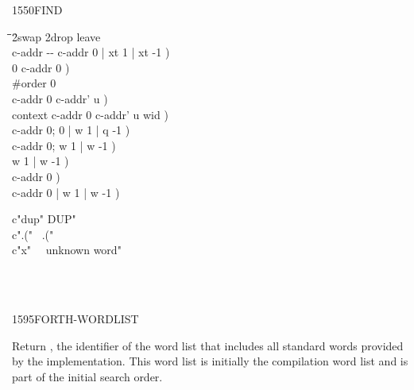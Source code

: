 \begin{worddef}{1550}{FIND}
\begin{implement}
		\begin{tabbing}
		\tab \= \tab \= \tab \= \tab \= 2swap 2drop leave \tab \= \\\kill
		\word{:}   c-addr -{}- c-addr 0 | xt 1 | xt -1 ) \+ \\
			0 														\>\>\>\>	 c-addr 0 ) \\
			\#order  0  \+ \\
				 							\>\>\>	 c-addr 0 c-addr' u ) \\
				  context \word{+} 		\>\>\>	 c-addr 0 c-addr' u wid ) \\
												\>\>\>	 c-addr 0; 0 | w 1 | q -1 ) \\
				 								\>\>\>	\word{p} c-addr 0; w 1 | w -1 ) \+ \\
				\>	  			\>		 w 1 | w -1 )  \\
															\>\>	 c-addr 0 ) \- \\
															\>\>\>	 c-addr 0 | w 1 | w -1 ) \- \\
		\word{;}
		\end{tabbing}
	\end{implement}

	\begin{testing}\ttfamily
		\word{:} c"dup"  DUP" \word{;} \\
		\word{:} c".("~  .("~ \word{;} \\
		\word{:} c"x"~~  unknown word" \word{;}

		 \\
		 \\
	\end{testing}
\end{worddef}


\begin{worddef}{1595}{FORTH-WORDLIST}
\item {}

	Return , the identifier of the word list that includes
	all standard words provided by the implementation. This word list
	is initially the compilation word list and is part of the initial
	search order.

	\begin{testing}
	\end{testing}
\end{worddef}


